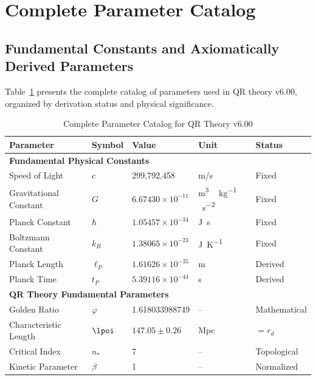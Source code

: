 \section{Complete Parameter Catalog}
\label{appendix:parameters}

\subsection{Fundamental Constants and Axiomatically Derived Parameters}
\label{subsec:fundamental-parameters}

Table~\ref{tab:fundamental-constants-complete} presents the complete catalog of parameters used in QR theory v6.00, organized by derivation status and physical significance.

\begin{table}[H]
  \caption{Complete Parameter Catalog for QR Theory v6.00}
  \label{tab:fundamental-constants-complete}
  \centering
  \small
  \begin{tabular}{@{}lllll@{}}
    \toprule
    \textbf{Parameter} & \textbf{Symbol} & \textbf{Value} & \textbf{Unit} & \textbf{Status} \\
    \midrule
    \multicolumn{5}{l}{\textbf{Fundamental Physical Constants}} \\
    \midrule
    Speed of Light & $c$ & 299{,}792{,}458 & \si{m/s} & Fixed \\
    Gravitational Constant & $G$ & $6.67430 \times 10^{-11}$ & \si{m^3\,kg^{-1}\,s^{-2}} & Fixed \\
    Planck Constant & $\hbar$ & $1.05457 \times 10^{-34}$ & \si{J.s} & Fixed \\
    Boltzmann Constant & $k_B$ & $1.38065 \times 10^{-23}$ & \si{J.K^{-1}} & Fixed \\
    Planck Length & $\ell_P$ & $1.61626 \times 10^{-35}$ & \si{m} & Derived \\
    Planck Time & $t_P$ & $5.39116 \times 10^{-44}$ & \si{s} & Derived \\
    \midrule
    \multicolumn{5}{l}{\textbf{QR Theory Fundamental Parameters}} \\
    \midrule
    Golden Ratio & $\varphi$ & 1.618033988749 & -- & Mathematical \\
    Characteristic Length & $\lpoi$ & $147.05 \pm 0.26$ & \si{Mpc} & $= r_d$ \\
    Critical Index & $n_\ast$ & 7 & -- & Topological \\
    Kinetic Parameter & $\beta$ & 1 & -- & Normalized \\

\end{tabular}
\end{table}
